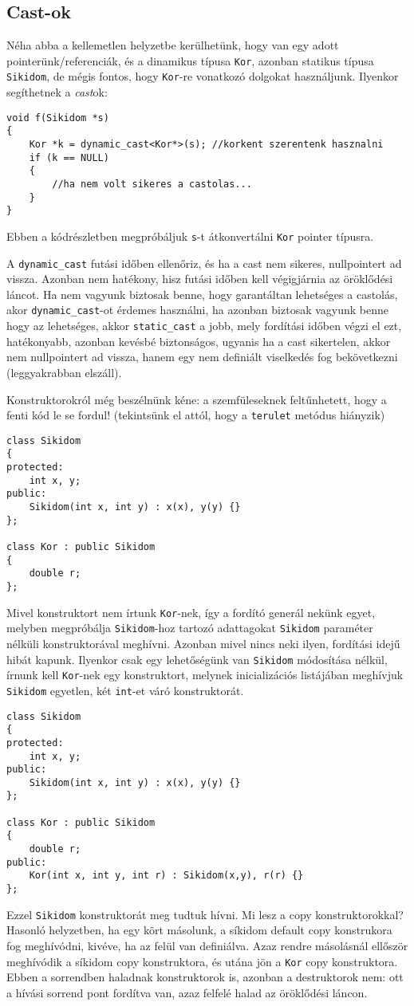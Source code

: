 \documentclass[a4paper,11.5pt]{article}
\begin{document}
	\subsection{Cast-ok}
	
	Néha abba a kellemetlen helyzetbe kerülhetünk, hogy van egy adott pointerünk/referenciák, és a dinamikus típusa \texttt{Kor}, azonban statikus típusa \texttt{Sikidom}, de mégis fontos, hogy \texttt{Kor}-re vonatkozó dolgokat használjunk. Ilyenkor segíthetnek a \textit{cast}ok:
	\begin{lstlisting}
void f(Sikidom *s)
{
	Kor *k = dynamic_cast<Kor*>(s); //korkent szerentenk hasznalni
	if (k == NULL)
	{
		//ha nem volt sikeres a castolas...
	}
}
	\end{lstlisting}
	Ebben a kódrészletben megpróbáljuk \texttt{s}-t átkonvertálni \texttt{Kor} pointer típusra.
	
	A \texttt{dynamic\_cast} futási időben ellenőriz, és ha a cast nem sikeres, nullpointert ad vissza. Azonban nem hatékony, hisz futási időben kell végigjárnia az öröklődési láncot. Ha nem vagyunk biztosak benne, hogy garantáltan lehetséges a castolás, akor \texttt{dynamic\_cast}-ot érdemes használni, ha azonban biztosak vagyunk benne hogy az lehetséges, akkor \texttt{static\_cast} a jobb, mely fordítási időben végzi el ezt, hatékonyabb, azonban kevésbé biztonságos, ugyanis ha a cast sikertelen, akkor nem nullpointert ad vissza, hanem egy nem definiált viselkedés fog bekövetkezni (leggyakrabban elszáll).
	
	Konstruktorokról még beszélnünk kéne: a szemfüleseknek feltűnhetett, hogy a fenti kód le se fordul! (tekintsünk el attól, hogy a \texttt{terulet} metódus hiányzik)
	\begin{lstlisting}
class Sikidom
{
protected:
	int x, y;
public:
	Sikidom(int x, int y) : x(x), y(y) {}
};

class Kor : public Sikidom
{
	double r;
};
	\end{lstlisting}
	Mivel konstruktort nem írtunk \texttt{Kor}-nek, így a fordító generál nekünk egyet, melyben megpróbálja \texttt{Sikidom}-hoz tartozó adattagokat \texttt{Sikidom} paraméter nélküli konstruktorával meghívni. Azonban mivel nincs neki ilyen, fordítási idejű hibát kapunk. Ilyenkor csak egy lehetőségünk van \texttt{Sikidom} módosítása nélkül, írnunk kell \texttt{Kor}-nek egy konstruktort, melynek inicializációs listájában meghívjuk \texttt{Sikidom} egyetlen, két \texttt{int}-et váró konstruktorát.
\begin{lstlisting}
class Sikidom
{
protected:
	int x, y;
public:
	Sikidom(int x, int y) : x(x), y(y) {}
};

class Kor : public Sikidom
{
	double r;
public:
	Kor(int x, int y, int r) : Sikidom(x,y), r(r) {}
};
\end{lstlisting}
	Ezzel \texttt{Sikidom} konstruktorát meg tudtuk hívni. Mi lesz a copy konstruktorokkal? Hasonló helyzetben, ha egy kört másolunk, a síkidom default copy konstrukora fog meghívódni, kivéve, ha az felül van definiálva. Azaz rendre másolásnál ellőször meghívódik a síkidom copy konstruktora, és utána jön a \texttt{Kor} copy konstruktora. Ebben a sorrendben haladnak konstruktorok is, azonban a destruktorok nem: ott a hívási sorrend pont fordítva van, azaz felfelé halad az öröklődési láncon.
	
\end{document}
